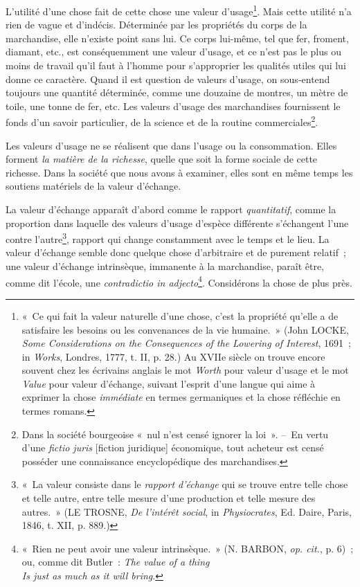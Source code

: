\documentclass[french,twoside]{book} %
\begin{document}
L’utilité d’une chose fait de cette chose une valeur d’usage\footnote{« Ce qui fait la valeur naturelle d’une chose, c’est la propriété qu’elle a de satisfaire les besoins ou les convenances de la vie humaine. » (John LOCKE, \emph{Some Considerations on the Consequences of the Lowering of Interest}, 1691 ; in \emph{Works}, Londres, 1777, t. II, p. 28.) Au XVIIe siècle on trouve encore souvent chez les écrivains anglais le mot \emph{Worth} pour valeur d’usage et le mot \emph{Value} pour valeur d’échange, suivant l’esprit d’une langue qui aime à exprimer la chose \emph{immédiate} en termes germaniques et la chose réfléchie en termes romans.}. Mais cette utilité n’a rien de vague et d’indécis. Déterminée par les propriétés du corps de la marchandise, elle n’existe point sans lui. Ce corps lui-même, tel que fer, froment, diamant, etc., est conséquemment une valeur d’usage, et ce n’est pas le plus ou moins de travail qu’il faut à l’homme pour s’approprier les qualités utiles qui lui donne ce caractère. Quand il est question de valeurs d’usage, on sous-entend toujours une quantité déterminée, comme une douzaine de montres, un mètre de toile, une tonne de fer, etc. Les valeurs d’usage des marchandises fournissent le fonds d’un savoir particulier, de la science et de la routine commerciales\footnote{Dans la société bourgeoise « nul n’est censé ignorer la loi ». – En vertu d’une \emph{fictio juris} [fiction juridique] économique, tout acheteur est censé posséder une connaissance encyclopédique des marchandises.}.\par
Les valeurs d’usage ne se réalisent que dans l’usage ou la consommation. Elles forment \emph{la matière de la richesse}, quelle que soit la forme sociale de cette richesse. Dans la société que nous avons à examiner, elles sont en même temps les soutiens matériels de la valeur d’échange.\par
La valeur d’échange apparaît d’abord comme le rapport \emph{quantitatif}, comme la proportion dans laquelle des valeurs d’usage d’espèce différente s’échangent l’une contre l’autre\footnote{« La valeur consiste dans le \emph{rapport d’échange} qui se trouve entre telle chose et telle autre, entre telle mesure d’une production et telle mesure des autres. » (LE TROSNE, \emph{De l’intérêt social}, in \emph{Physiocrates}, Ed. Daire, Paris, 1846, t. XII, p. 889.)}, rapport qui change constamment avec le temps et le lieu. La valeur d’échange semble donc quelque chose d’arbitraire et de purement relatif ; une valeur d’échange intrinsèque, immanente à la marchandise, paraît être, comme dit l’école, une \emph{contradictio in adjecto}\footnote{« Rien ne peut avoir une valeur intrinsèque. » (N. BARBON, \emph{op. cit.}, p. 6) ; ou, comme dit Butler : \emph{The value of a thing} \\
\emph{Is just as much as it will bring}.}. Considérons la chose de plus près.\par
\end{document}
